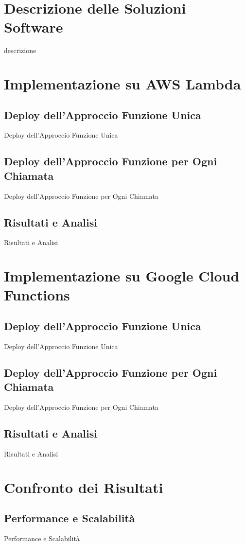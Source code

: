 \documentclass[12pt,a4paper,twoside]{book}
\begin{document}
\section{Descrizione delle Soluzioni Software}
descrizione

\section{Implementazione su AWS Lambda}
\subsection{Deploy dell’Approccio Funzione Unica}
Deploy dell’Approccio Funzione Unica

\subsection{Deploy dell’Approccio Funzione per Ogni Chiamata}
Deploy dell’Approccio Funzione per Ogni Chiamata

\subsection{Risultati e Analisi}
Risultati e Analisi

\section{Implementazione su Google Cloud Functions}
\subsection{Deploy dell’Approccio Funzione Unica}
Deploy dell’Approccio Funzione Unica

\subsection{Deploy dell’Approccio Funzione per Ogni Chiamata}
Deploy dell’Approccio Funzione per Ogni Chiamata

\subsection{Risultati e Analisi}
Risultati e Analisi

\section{Confronto dei Risultati}
\subsection{Performance e Scalabilità}
Performance e Scalabilità
\end{document}
